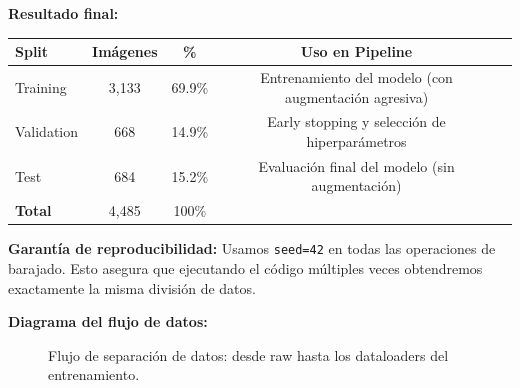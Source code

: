 \documentclass[11pt,a4paper]{article}
\begin{document}
\textbf{Resultado final:}
\begin{center}
\begin{tabular}{lcccc}
\toprule
\textbf{Split} & \textbf{Imágenes} & \textbf{\%} & \textbf{Uso en Pipeline} \\
\midrule
Training   & 3,133 & 69.9\% & Entrenamiento del modelo (con augmentación agresiva) \\
Validation & 668   & 14.9\% & Early stopping y selección de hiperparámetros \\
Test       & 684   & 15.2\% & Evaluación final del modelo (sin augmentación) \\
\midrule
\textbf{Total}    & 4,485 & 100\% & \\
\bottomrule
\end{tabular}
\end{center}

\textbf{Garantía de reproducibilidad:} Usamos \texttt{seed=42} en todas las operaciones de barajado. Esto asegura que ejecutando el código múltiples veces obtendremos exactamente la misma división de datos.

\textbf{Diagrama del flujo de datos:}

\begin{figure}[H]
\centering
{}
\caption{Flujo de separación de datos: desde raw hasta los dataloaders del entrenamiento.}
\label{fig:data-flow}
\end{figure}
\end{document}
